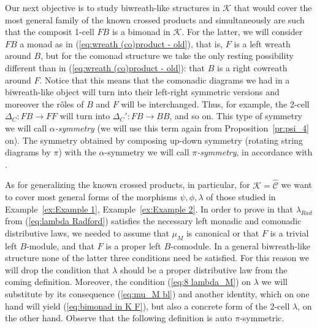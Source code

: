 \documentclass[a4paper, 12pt]{article}
\renewcommand{\_}[1]{\mbox{$_{\left( #1 \right)}$}}
\theoremstyle{plain}
\newcommand{\C}{{\mathcal C}}
\def\K{{\mathcal K}}  %
\newcommand{\exref}[1]{Example~\ref{ex:#1}}
\newcommand{\equref}[1]{(\ref{eq:#1})}
\newcommand{\prref}[1]{Proposition~\ref{pr:#1}}
\begin{document}
Our next objective is to study biwreath-like structures in $\K$ that would cover the most general family of the known crossed products and simultaneously are such that the 
composit 1-cell $FB$ is a bimonad in $\K$. For the latter, we will consider $FB$ a monad as in \equref{wreath (co)product - old}, that is, $F$ is a left wreath around $B$, 
but for the comonad structure we take the only resting possibility different than in \equref{wreath (co)product - old}: that $B$ is a right cowreath around $F$. 
Notice that this means that the comonadic diagrams we had in a biwreath-like object will turn into their left-right 
symmetric versions and moreover the r\^oles of $B$ and $F$ will be interchanged. Thus, for example, the 2-cell $\Delta_C: FB\to FF$ will turn into $\Delta_C': FB\to BB$, and so on. 
This type of symmetry we will call {\em $\alpha$-symmetry} (we will use this term again from \prref{psi_4} on). The symmetry obtained by composing up-down symmetry (rotating 
string diagrams by $\pi$) with the $\alpha$-symmetry we will call {\em $\pi$-symmetry}, in accordance with \cite{BD}. 

As for generalizing the known crossed products, in particular, for $\K=\hat\C$ we want to cover most general forms of the morphisms $\psi, \phi, \lambda$ of those studied in 
\exref{Example 1}, \exref{Example 2}. 
In order to prove in \cite[Lemma 5.2]{Femic5} that $\lambda_{Rad}$ from \equref{lambda Radford} satisfies the necessary left monadic and comonadic distributive laws,  
we needed to assume that $\mu_M$ is canonical or that $F$ is a trivial left $B$-module,  
and that $F$ is a proper left $B$-comodule. In a general biwreath-like structure none of the latter three conditions need be satisfied. For this reason we will drop the 
condition that $\lambda$ should be a proper distributive law from the coming definition. Moreover, the condition \equref{8 lambda_M} on $\lambda$ 
we will substitute by its consequence \equref{mu_M bl} and another identity, which on one hand will yield \equref{bimonad in K F}, but also a concrete form of the 2-cell $\lambda$, on the other hand. 
Observe that the following definition is auto $\pi$-symmetric. 
\end{document}
